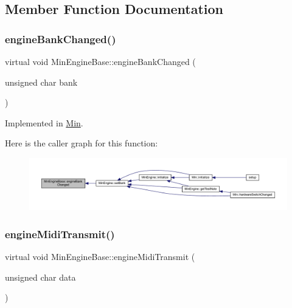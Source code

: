 \subsection{Member Function Documentation}
\mbox{\label{class_min_engine_base_a7c1b890b5c7f0004969304880aaaf563}} 
\subsubsection{\texorpdfstring{engine\+Bank\+Changed()}{engineBankChanged()}}
{\footnotesize\ttfamily virtual void Min\+Engine\+Base\+::engine\+Bank\+Changed (\begin{DoxyParamCaption}\item[{unsigned char}]{bank }\end{DoxyParamCaption})\hspace{0.3cm}{\ttfamily [pure virtual]}}



Implemented in \hyperlink{class_min_a24ca9b52ba9755b458f6141d730bb9b1}{Min}.

Here is the caller graph for this function\+:
\nopagebreak
\begin{figure}[H]
\begin{center}
\leavevmode
\includegraphics[width=350pt]{class_min_engine_base_a7c1b890b5c7f0004969304880aaaf563_icgraph}
\end{center}
\end{figure}
\mbox{\label{class_min_engine_base_aaed6930bcc32b2cccf9479fb73d043d9}} 
\subsubsection{\texorpdfstring{engine\+Midi\+Transmit()}{engineMidiTransmit()}}
{\footnotesize\ttfamily virtual void Min\+Engine\+Base\+::engine\+Midi\+Transmit (\begin{DoxyParamCaption}\item[{unsigned char}]{data }\end{DoxyParamCaption})\hspace{0.3cm}{\ttfamily [pure virtual]}}



